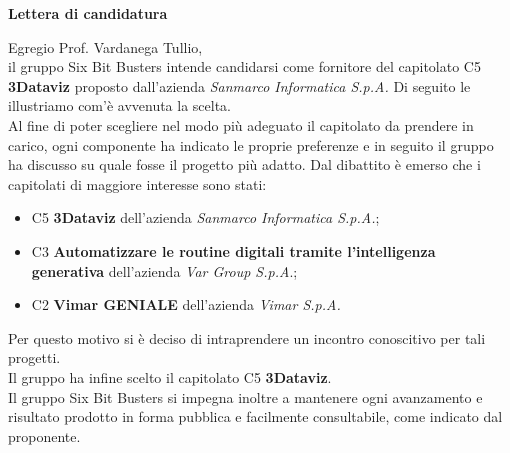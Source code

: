 \begin{titlepage}
\begin{center}
	{\Huge{ \textbf{Lettera di candidatura} } }\\[1cm]
        \end{center}
	\hspace{0.5cm}Egregio Prof. Vardanega Tullio, \\
        il gruppo Six Bit Busters intende candidarsi come fornitore del capitolato C5 \textbf{3Dataviz} proposto dall’azienda \textit{Sanmarco Informatica S.p.A.} Di seguito le illustriamo com'è avvenuta la scelta. \\
        \hspace{0.5cm}Al fine di poter scegliere nel modo più adeguato il capitolato da prendere in carico, ogni componente ha indicato le proprie preferenze e in seguito il gruppo ha discusso su quale fosse il progetto più adatto. Dal dibattito è emerso che i capitolati di maggiore interesse sono stati:
        \begin{itemize}
            \item C5 \textbf{3Dataviz} dell’azienda \textit{Sanmarco Informatica S.p.A.};
            \item C3 \textbf{Automatizzare le routine digitali tramite l’intelligenza generativa} dell’azienda \textit{Var Group S.p.A}.;
            \item C2 \textbf{Vimar GENIALE} dell’azienda \textit{Vimar S.p.A.}
        \end{itemize}
        Per questo motivo si è deciso di intraprendere un incontro conoscitivo per tali progetti. \\Il gruppo ha infine scelto il capitolato C5\textbf{ 3Dataviz}.\\
        Il gruppo Six Bit Busters si impegna inoltre a mantenere ogni avanzamento e risultato prodotto in forma pubblica e facilmente consultabile, come indicato dal proponente.
	
	
	
\end{titlepage}
